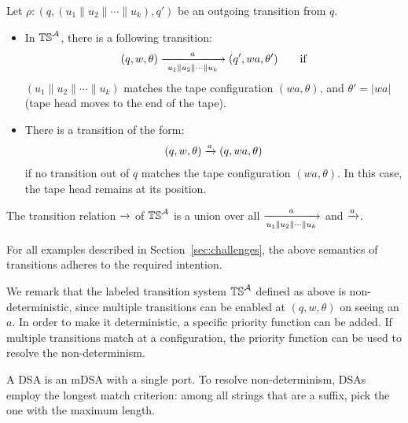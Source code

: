 Let $\rho: (q, (u_1 \parallel u_2 \parallel \cdots \parallel u_k), q')$ be an outgoing transition from $q$. 
\begin{itemize}
\item In $\mathbb{TS}^{\mathcal{A}}$, there is a following transition:
\begin{align*}
 (q, w, \theta) \xrightarrow[~u_1 \parallel u_2 \parallel \cdots \parallel u_k~]{a} (q', wa, \theta') \qquad \text{if}
\end{align*}
$(u_1 \parallel u_2 \parallel \cdots \parallel u_k)$ matches the tape configuration $(wa, \theta)$, and $\theta' = |wa|$ (tape head moves to the end of the tape).
\item There is a transition of the form:
\begin{align*}
  (q, w, \theta) \xrightarrow{a} (q, wa, \theta)
\end{align*}
if no transition out of $q$ matches the tape configuration $(wa, \theta)$. In this case, the tape head remains at its position.
\end{itemize} 

The transition relation $\xrightarrow{}$ of $\mathbb{TS}^{\mathcal{A}}$ is a union over all $\xrightarrow[u_1 \parallel u_2 \parallel \cdots \parallel u_k]{a}$ and $\xrightarrow{a}$.


 For all examples described in Section~\ref{sec:challenges}, the above semantics of transitions adheres to the required intention. 

\begin{remark}
We remark that the labeled transition system $\mathbb{TS}^{\mathcal{A}}$ defined as above is non-deterministic, since multiple transitions can be enabled at $(q, w, \theta)$ on seeing an $a$. In order to make it deterministic, a specific priority function can be added. If multiple transitions match at a configuration, the priority function can be used to resolve the non-determinism.
\end{remark}

\begin{remark}
A DSA is an mDSA with a single port. To resolve non-determinism, DSAs employ the longest match criterion: among all strings that are a suffix, pick the one with the maximum length.
\end{remark}

